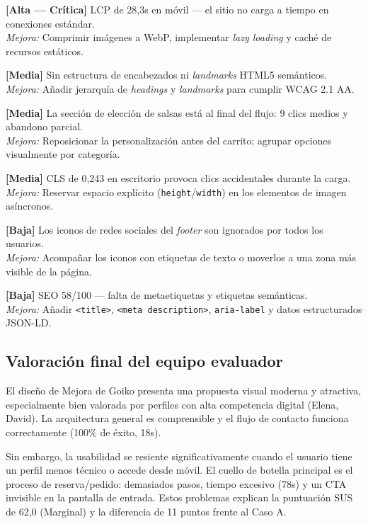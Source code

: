 \documentclass[11pt,a4paper]{article}
\begin{document}
\medskip
\noindent\textbf{[Alta — Crítica]}\enspace
LCP de 28,3s en móvil — el sitio no carga a tiempo en conexiones estándar.\\
\textit{Mejora:} Comprimir imágenes a WebP, implementar \textit{lazy loading} y caché de
recursos estáticos.

\medskip
\noindent\textbf{[Media]}\enspace
Sin estructura de encabezados ni \textit{landmarks} HTML5 semánticos.\\
\textit{Mejora:} Añadir jerarquía de \textit{headings} y \textit{landmarks} para cumplir
WCAG 2.1 AA.

\medskip
\noindent\textbf{[Media]}\enspace
La sección de elección de salsas está al final del flujo: 9 clics medios y abandono parcial.\\
\textit{Mejora:} Reposicionar la personalización antes del carrito; agrupar opciones
visualmente por categoría.

\medskip
\noindent\textbf{[Media]}\enspace
CLS de 0,243 en escritorio provoca clics accidentales durante la carga.\\
\textit{Mejora:} Reservar espacio explícito (\texttt{height}/\texttt{width}) en los
elementos de imagen asíncronos.

\medskip
\noindent\textbf{[Baja]}\enspace
Los iconos de redes sociales del \textit{footer} son ignorados por todos los usuarios.\\
\textit{Mejora:} Acompañar los iconos con etiquetas de texto o moverlos a una zona
más visible de la página.

\medskip
\noindent\textbf{[Baja]}\enspace
SEO 58/100 — falta de metaetiquetas y etiquetas semánticas.\\
\textit{Mejora:} Añadir \texttt{<title>}, \texttt{<meta description>},
\texttt{aria-label} y datos estructurados JSON-LD.

\subsection{Valoración final del equipo evaluador}

El diseño de Mejora de Goiko presenta una propuesta visual moderna y atractiva, especialmente
bien valorada por perfiles con alta competencia digital (Elena, David). La arquitectura general
es comprensible y el flujo de contacto funciona correctamente (100\% de éxito, 18s).

Sin embargo, la usabilidad se resiente significativamente cuando el usuario tiene un perfil
menos técnico o accede desde móvil. El cuello de botella principal es el proceso de
reserva/pedido: demasiados pasos, tiempo excesivo (78s) y un CTA invisible en la pantalla
de entrada. Estos problemas explican la puntuación SUS de 62,0 (Marginal) y la diferencia
de 11 puntos frente al Caso A.
\end{document}

